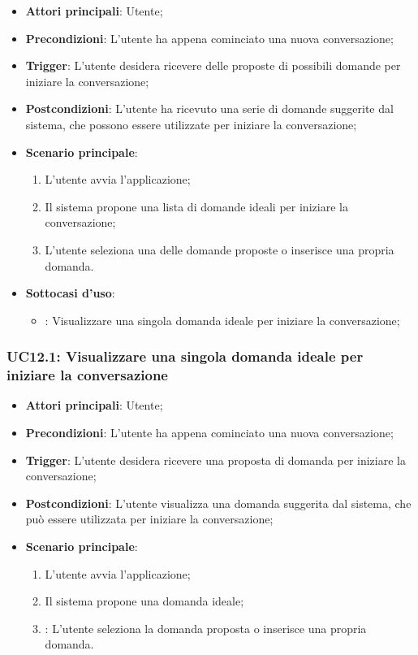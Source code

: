 \begin{itemize}
    \item \textbf{Attori principali}: Utente;
    \item \textbf{Precondizioni}: L'utente ha appena cominciato una nuova conversazione;
    \item \textbf{Trigger}: L'utente desidera ricevere delle proposte di possibili domande per iniziare la conversazione;
    \item \textbf{Postcondizioni}: L'utente ha ricevuto una serie di domande suggerite dal sistema, che possono essere utilizzate per iniziare la conversazione;
    \item \textbf{Scenario principale}:
    \begin{enumerate}
        \item L'utente avvia l'applicazione;
        \item Il sistema propone una lista di domande ideali per iniziare la conversazione;
        \item L'utente seleziona una delle domande proposte o inserisce una propria domanda.
    \end{enumerate}
    \item \textbf{Sottocasi d'uso}:
    \begin{itemize}
        \item {}: Visualizzare una singola domanda ideale per iniziare la conversazione;
    \end{itemize}
\end{itemize}

\hypertarget{UC12.1}{}
\subsubsection{UC12.1: Visualizzare una singola domanda ideale per iniziare la conversazione}

\begin{itemize}
    \item \textbf{Attori principali}: Utente;
    \item \textbf{Precondizioni}: L'utente ha appena cominciato una nuova conversazione;
    \item \textbf{Trigger}: L'utente desidera ricevere una proposta di domanda per iniziare la conversazione;
    \item \textbf{Postcondizioni}: L'utente visualizza una domanda suggerita dal sistema, che può essere utilizzata per iniziare la conversazione;
    \item \textbf{Scenario principale}:
    \begin{enumerate}
        \item L'utente avvia l'applicazione;
        \item Il sistema propone una domanda ideale;
        \item {}: L'utente seleziona la domanda proposta o inserisce una propria domanda.
    \end{enumerate}
\end{itemize}

